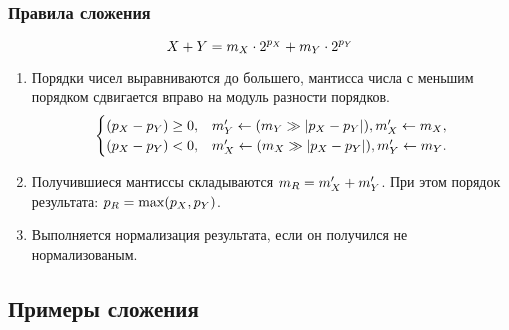 \begin{frame}
    \frametitle{Правила сложения}

    \[X+Y=m_{X}\cdot {2}^{p_{X}}+m_{Y}\cdot {2}^{p_{Y}}\]
        
    \begin{enumerate}
        \item Порядки чисел выравниваются до большего, мантисса числа с меньшим порядком сдвигается вправо на модуль разности порядков.
        \[
            \begin{cases}
                (p_{X}-p_{Y}) \ge 0, & m_{Y}'\gets(m_{Y}\gg |p_{X}-p_{Y}|), m_{X}'\gets m_{X},\\
                (p_{X}-p_{Y}) < 0,   & m_{X}'\gets(m_{X}\gg |p_{X}-p_{Y}|), m_{Y}'\gets m_{Y}.
            \end{cases}
        \]
        \item Получившиеся мантиссы складываются $m_{R}=m_{X}'+m_{Y}'$. При этом порядок результата: $p_{R}=\max(p_{X}, p_{Y})$.
        
        \item Выполняется нормализация результата, если он получился не нормализованым.
    \end{enumerate}
\end{frame}


\subsection{Примеры сложения}

